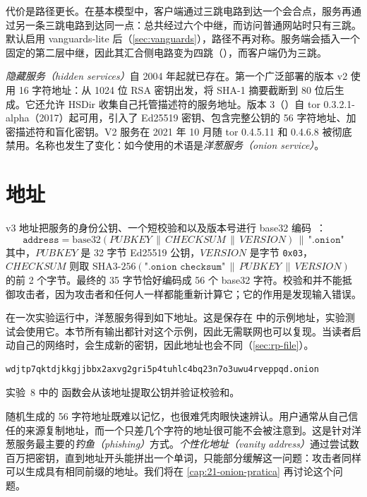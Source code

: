 代价是路径更长。在基本模型中，客户端通过三跳电路到达一个会合点，服务再通过另一条三跳电路到达同一点：总共经过六个中继，而访问普通网站时只有三跳。默认启用 vanguards-lite 后（\cref{sec:vanguards}），路径不再对称。服务端会插入一个固定的第二层中继，因此其汇合侧电路变为四跳（），而客户端仍为三跳。

\begin{storia}[从 v2 到 v3]
\emph{隐藏服务（hidden services）}自 2004 年起就已存在。第一个广泛部署的版本 v2 使用 16 字符地址：从 1024 位 RSA 密钥出发，将 SHA-1 摘要截断到 80 位后生成。它还允许 HSDir 收集自己托管描述符的服务地址。版本 3（）自 tor 0.3.2.1-alpha（2017）起可用，引入了 Ed25519 密钥、包含完整公钥的 56 字符地址、加密描述符和盲化密钥。V2 服务在 2021 年 10 月随 tor 0.4.5.11 和 0.4.6.8 被彻底禁用。名称也发生了变化：如今使用的术语是\emph{洋葱服务（onion service）}。
\end{storia}

\section{地址}\label{sec:os-indirizzo}

v3 地址把服务的身份公钥、一个短校验和以及版本号进行 base32 编码~：
\[
\texttt{address} = \mathrm{base32}(\mathit{PUBKEY} \,\|\, \mathit{CHECKSUM} \,\|\, \mathit{VERSION}) \,\|\, \texttt{".onion"}
\]
其中，$\mathit{PUBKEY}$ 是 32 字节 Ed25519 公钥，$\mathit{VERSION}$ 是字节 \texttt{0x03}，$\mathit{CHECKSUM}$ 则取
$\mathrm{SHA3\text{-}256}(\texttt{".onion checksum"} \,\|\, \mathit{PUBKEY} \,\|\, \mathit{VERSION})$
的前 2 个字节。最终的 35 字节恰好编码成 56 个 base32 字符。校验和并不能抵御攻击者，因为攻击者和任何人一样都能重新计算它；它的作用是发现输入错误。

在一次实验运行中，洋葱服务得到如下地址。这是保存在  中的示例地址，实验测试会使用它。本节所有输出都针对这个示例，因此无需联网也可以复现。当读者启动自己的网络时，会生成新的密钥，因此地址也会不同（\cref{sec:rp-file}）。
\begin{lstlisting}[numbers=none]
wdjtp7qktdjkkgjjbbx2axvg2gri5p4tuhlc4bq23n7o3uwu4rveppqd.onion
\end{lstlisting}
实验~8 中的  函数会从该地址提取公钥并验证校验和。

\begin{attenzione}[不能靠记忆识别地址]
随机生成的 56 字符地址既难以记忆，也很难凭肉眼快速辨认。用户通常从自己信任的来源复制地址，而一个只差几个字符的地址很可能不会被注意到。这是针对洋葱服务最主要的\emph{钓鱼（phishing）}方式。\emph{个性化地址（vanity address）}通过尝试数百万把密钥，直到地址开头能拼出一个单词，只能部分缓解这一问题：攻击者同样可以生成具有相同前缀的地址。我们将在 \cref{cap:21-onion-pratica} 再讨论这个问题。
\end{attenzione}

